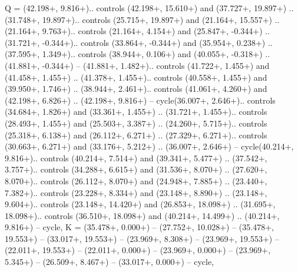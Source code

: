 {Q} = {(42.198+\ctpXshift, 9.816+\ctpYshift).. controls (42.198+\ctpXshift, 15.610+\ctpYshift) and (37.727+\ctpXshift, 19.897+\ctpYshift) .. (31.748+\ctpXshift, 19.897+\ctpYshift).. controls (25.715+\ctpXshift, 19.897+\ctpYshift) and (21.164+\ctpXshift, 15.557+\ctpYshift) .. (21.164+\ctpXshift, 9.763+\ctpYshift).. controls (21.164+\ctpXshift, 4.154+\ctpYshift) and (25.847+\ctpXshift, -0.344+\ctpYshift) .. (31.721+\ctpXshift, -0.344+\ctpYshift).. controls (33.864+\ctpXshift, -0.344+\ctpYshift) and (35.954+\ctpXshift, 0.238+\ctpYshift) .. (37.595+\ctpXshift, 1.349+\ctpYshift).. controls (38.944+\ctpXshift, 0.106+\ctpYshift) and (40.055+\ctpXshift, -0.318+\ctpYshift) .. (41.881+\ctpXshift, -0.344+\ctpYshift) -- (41.881+\ctpXshift, 1.482+\ctpYshift).. controls (41.722+\ctpXshift, 1.455+\ctpYshift) and (41.458+\ctpXshift, 1.455+\ctpYshift) .. (41.378+\ctpXshift, 1.455+\ctpYshift).. controls (40.558+\ctpXshift, 1.455+\ctpYshift) and (39.950+\ctpXshift, 1.746+\ctpYshift) .. (38.944+\ctpXshift, 2.461+\ctpYshift).. controls (41.061+\ctpXshift, 4.260+\ctpYshift) and (42.198+\ctpXshift, 6.826+\ctpYshift) .. (42.198+\ctpXshift, 9.816+\ctpYshift) -- cycle(36.007+\ctpXshift, 2.646+\ctpYshift).. controls (34.684+\ctpXshift, 1.826+\ctpYshift) and (33.361+\ctpXshift, 1.455+\ctpYshift) .. (31.721+\ctpXshift, 1.455+\ctpYshift).. controls (28.493+\ctpXshift, 1.455+\ctpYshift) and (25.503+\ctpXshift, 3.387+\ctpYshift) .. (24.260+\ctpXshift, 5.715+\ctpYshift).. controls (25.318+\ctpXshift, 6.138+\ctpYshift) and (26.112+\ctpXshift, 6.271+\ctpYshift) .. (27.329+\ctpXshift, 6.271+\ctpYshift).. controls (30.663+\ctpXshift, 6.271+\ctpYshift) and (33.176+\ctpXshift, 5.212+\ctpYshift) .. (36.007+\ctpXshift, 2.646+\ctpYshift) -- cycle(40.214+\ctpXshift, 9.816+\ctpYshift).. controls (40.214+\ctpXshift, 7.514+\ctpYshift) and (39.341+\ctpXshift, 5.477+\ctpYshift) .. (37.542+\ctpXshift, 3.757+\ctpYshift).. controls (34.288+\ctpXshift, 6.615+\ctpYshift) and (31.536+\ctpXshift, 8.070+\ctpYshift) .. (27.620+\ctpXshift, 8.070+\ctpYshift).. controls (26.112+\ctpXshift, 8.070+\ctpYshift) and (24.948+\ctpXshift, 7.885+\ctpYshift) .. (23.440+\ctpXshift, 7.382+\ctpYshift).. controls (23.228+\ctpXshift, 8.334+\ctpYshift) and (23.148+\ctpXshift, 8.890+\ctpYshift) .. (23.148+\ctpXshift, 9.604+\ctpYshift).. controls (23.148+\ctpXshift, 14.420+\ctpYshift) and (26.853+\ctpXshift, 18.098+\ctpYshift) .. (31.695+\ctpXshift, 18.098+\ctpYshift).. controls (36.510+\ctpXshift, 18.098+\ctpYshift) and (40.214+\ctpXshift, 14.499+\ctpYshift) .. (40.214+\ctpXshift, 9.816+\ctpYshift) -- cycle},
{K} = {(35.478+\ctpXshift, 0.000+\ctpYshift) -- (27.752+\ctpXshift, 10.028+\ctpYshift) -- (35.478+\ctpXshift, 19.553+\ctpYshift) -- (33.017+\ctpXshift, 19.553+\ctpYshift) -- (23.969+\ctpXshift, 8.308+\ctpYshift) -- (23.969+\ctpXshift, 19.553+\ctpYshift) -- (22.011+\ctpXshift, 19.553+\ctpYshift) -- (22.011+\ctpXshift, 0.000+\ctpYshift) -- (23.969+\ctpXshift, 0.000+\ctpYshift) -- (23.969+\ctpXshift, 5.345+\ctpYshift) -- (26.509+\ctpXshift, 8.467+\ctpYshift) -- (33.017+\ctpXshift, 0.000+\ctpYshift) -- cycle},
